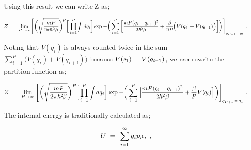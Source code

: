 \documentclass{article}
\newcounter{subsubsubsection}[subsubsection]
\begin{document}
Using this result we can write Z as;

\begin{equation} \label{eq:1}
Z \hspace{0.125cm} = \hspace{0.125cm} \lim_{P \rightarrow \infty} \Bigg[ \bigg(\sqrt{\frac{m P}{2 \pi \hbar^2 \beta}}\bigg)^{P} \bigg[ \prod_{i=1}^{P} \int d q_i \bigg] \exp{- \bigg( \sum_{i = 1}^{P} \bigg[ \frac{ m P (q_i - q_{i+1})^2}{2 \hbar^2 \beta} + \frac{\beta}{2P} \Big( V(q_i) + V(q_{i + 1}) \Big) \bigg] \bigg)} \Bigg]_{q_{P + 1} \hspace{0.05cm} = \hspace{0.05cm} q_1} \hspace{0.125cm} .
\end{equation}

Noting that \begin{math} V(q_i) \end{math} is always counted twice in the sum \begin{math} \sum_{i = 1}^{P} \Big( V(q_i) + V(q_{i + 1}) \Big) \end{math} because \begin{math} V(q_1) \hspace{0.025cm} = \hspace{0.025cm} V(q_{i + 1}) \end{math}, we can rewrite the partition function as; 

\begin{equation} \label{eq:1}
Z \hspace{0.125cm} = \hspace{0.125cm} \lim_{P \rightarrow \infty} \Bigg[ \bigg(\sqrt{\frac{m P}{2 \pi \hbar^2 \beta}}\bigg)^{P} \bigg[ \prod_{i=1}^{P} \int d q_i \bigg] \exp{- \bigg( \sum_{i = 1}^{P} \Big[ \frac{ m P (q_i - q_{i+1})^2}{2 \hbar^2 \beta} + \frac{\beta}{P} V(q_i) \Big] \bigg)} \Bigg]_{q_{P + 1} \hspace{0.05cm} = \hspace{0.05cm} q_1} \hspace{0.125cm} .
\end{equation}


The internal energy is traditionally calculated as;

\begin{equation} \label{eq:1}
U \hspace{0.125cm} = \hspace{0.125cm} \sum_{i = 1}^{\infty} g_i p_i \epsilon_{i} \hspace{0.125cm} ,
\end{equation}
\end{document}

